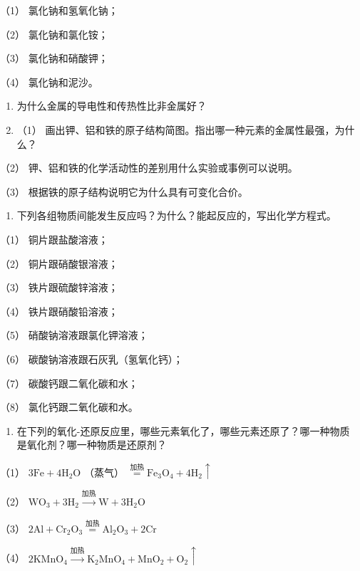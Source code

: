 （1） 氯化钠和氢氧化钠；

（2） 氯化钠和氯化铵；

（3） 氯化钠和硝酸钾；

（4） 氯化钠和泥沙。

\begin{enumerate}[start=6]
\item
  为什么金属的导电性和传热性比非金属好？
\item
  （1）
  画出钾、铝和铁的原子结构简图。指出哪一种元素的金属性最强，为什么？
\end{enumerate}

（2） 钾、铝和铁的化学活动性的差别用什么实验或事例可以说明。

（3） 根据铁的原子结构说明它为什么具有可变化合价。

\begin{enumerate}[start=8]
\item
  下列各组物质间能发生反应吗？为什么？能起反应的，写出化学方程式。
\end{enumerate}

（1） 铜片跟盐酸溶液；

（2） 铜片跟硝酸银溶液；

（3） 铁片跟硫酸锌溶液；

（4） 铁片跟硝酸铅溶液；

（5） 硝酸钠溶液跟氯化钾溶液；

（6） 碳酸钠溶液跟石灰乳（氢氧化钙）；

（7） 碳酸钙跟二氧化碳和水；

（8） 氯化钙跟二氧化碳和水。

\begin{enumerate}[start=9]
\item
  在下列的氧化-还原反应里，哪些元素氧化了，哪些元素还原了？哪一种物质是氧化剂？哪一种物质是还原剂？
\end{enumerate}

（1） \(3\mathrm{Fe} + 4\mathrm{H}_{2}\mathrm{O}\) （蒸气）
\(\overset{\text{加热}}{=} \mathrm{Fe}_{3}\mathrm{O}_{4} + 4\mathrm{H}_{2}\uparrow\)

（2）
\(\mathrm{WO}_{3} + 3\mathrm{H}_{2}\xrightarrow{\text{加热}}\mathrm{W} + 3\mathrm{H}_{2}\mathrm{O}\)

（3）
\(2\mathrm{Al} + \mathrm{Cr}_{2}\mathrm{O}_{3}\overset{\text{加热}}{=}\mathrm{Al}_{2}\mathrm{O}_{3} + 2\mathrm{Cr}\)

（4）
\(2\mathrm{KMnO}_4\xrightarrow{\text{加热}}\mathrm{K}_2\mathrm{MnO}_4 + \mathrm{MnO}_2 + \mathrm{O}_2\uparrow\)

